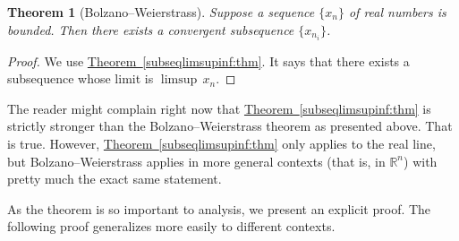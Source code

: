 \documentclass[12pt]{book}
\newcommand{\R}{{\mathbb{R}}}
\theoremstyle{plain}
\newtheorem{thm}{Theorem}[section]
\theoremstyle{remark}
\theoremstyle{definition}
\theoremstyle{exercise}
\theoremstyle{example}
\newcommand{\thmref}[1]{\hyperref[#1]{Theorem~\ref*{#1}}}
\begin{document}
\begin{thm}[Bolzano--Weierstrass]\label{thm:bwseq}
Suppose a sequence $\{ x_n \}$ of real numbers is bounded.
Then there exists a convergent subsequence $\{ x_{n_i} \}$.
\end{thm}

\begin{proof}
We use \thmref{subseqlimsupinf:thm}.  It says that there exists
a subsequence whose limit is $\limsup \, x_n$.
\end{proof}

The reader might complain right now that 
\thmref{subseqlimsupinf:thm} is strictly stronger than the
Bolzano--Weierstrass theorem as presented above.  That is true.
However, 
\thmref{subseqlimsupinf:thm} only applies to the real line, but
Bolzano--Weierstrass applies in more general contexts (that is, in $\R^n$)
with pretty much the exact same statement.

As the theorem is so important to analysis, we present an explicit
proof.
The following proof generalizes more easily to different contexts.
\end{document}
